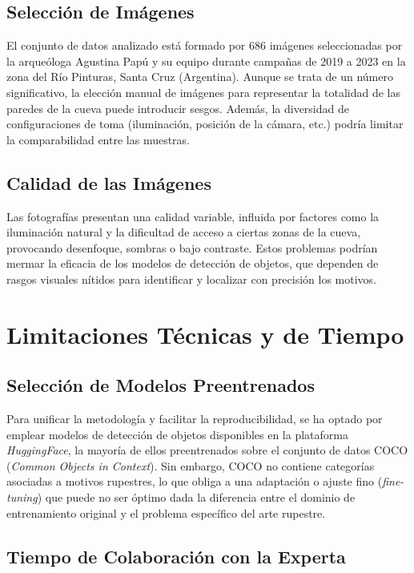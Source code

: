 \subsection{Selección de Imágenes}

El conjunto de datos analizado está formado por 686 imágenes seleccionadas por la arqueóloga Agustina Papú y su equipo durante campañas de 2019 a 2023 en la zona del Río Pinturas, Santa Cruz (Argentina). Aunque se trata de un número significativo, la elección manual de imágenes para representar la totalidad de las paredes de la cueva puede introducir sesgos. Además, la diversidad de configuraciones de toma (iluminación, posición de la cámara, etc.) podría limitar la comparabilidad entre las muestras.

\subsection{Calidad de las Imágenes}

Las fotografías presentan una calidad variable, influida por factores como la iluminación natural y la dificultad de acceso a ciertas zonas de la cueva, provocando desenfoque, sombras o bajo contraste. Estos problemas podrían mermar la eficacia de los modelos de detección de objetos, que dependen de rasgos visuales nítidos para identificar y localizar con precisión los motivos.

\section{Limitaciones Técnicas y de Tiempo}

\subsection{Selección de Modelos Preentrenados}

Para unificar la metodología y facilitar la reproducibilidad, se ha optado por emplear modelos de detección de objetos disponibles en la plataforma \textit{HuggingFace}, la mayoría de ellos preentrenados sobre el conjunto de datos COCO (\textit{Common Objects in Context}). Sin embargo, COCO no contiene categorías asociadas a motivos rupestres, lo que obliga a una adaptación o ajuste fino (\textit{fine-tuning}) que puede no ser óptimo dada la diferencia entre el dominio de entrenamiento original y el problema específico del arte rupestre.

\subsection{Tiempo de Colaboración con la Experta}

